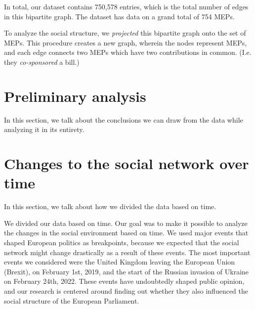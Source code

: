 \documentclass[lettersize,journal]{IEEEtran}
\begin{document}
In total, our dataset contains 750,578 entries, which is the total number of edges in this bipartite graph. The dataset has data on a grand total of 754 MEPs. %

To analyze the social structure, we \textit{projected} this bipartite graph onto the set of MEPs. This procedure creates a new graph, wherein the nodes represent MEPs, and each edge connects two MEPs which have two contributions in common. (I.e. they \textit{co-sponsored} a bill.)


\section{Preliminary analysis}

In this section, we talk about the conclusions we can draw from the data while analyzing it in its entirety.

\section{Changes to the social network over time}

In this section, we talk about how we divided the data based on time.

We divided our data based on time. Our goal was to make it possible to analyze the changes in the social environment based on time. We used major events that shaped European politics as breakpoints, because we expected that the social network might change drastically as a result of these events. The most important events we considered were the United Kingdom leaving the European Union (Brexit), on February 1st, 2019, and the start of the Russian invasion of Ukraine on February 24th, 2022. These events have undoubtedly shaped public opinion, and our research is centered around finding out whether they also influenced the social structure of the European Parliament.
\end{document}
